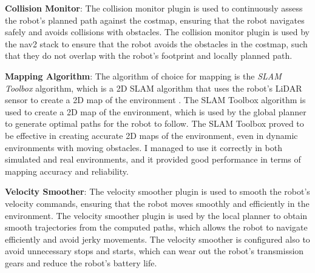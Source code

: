 \textbf{Collision Monitor}:
The collision monitor plugin is used to continuously assess the robot's planned path against the costmap, ensuring
that the robot navigates safely and avoids collisions with obstacles. The collision monitor plugin is used by the
nav2 stack to ensure that the robot avoids the obstacles in the costmap, such that they do not overlap with the robot's
footprint and locally planned path.

\textbf{Mapping Algorithm}:
The algorithm of choice for mapping is the \textit{SLAM Toolbox} algorithm, which is a 2D SLAM algorithm
that uses the robot's LiDAR sensor to create a 2D map of the environment \cite{Macenski2021slamtoolbox}.
The SLAM Toolbox algorithm is used to create
a 2D map of the environment, which is used by the global planner to generate optimal paths for the robot to follow.
The SLAM Toolbox proved to be effective in creating accurate 2D maps of the environment, even in dynamic environments
with moving obstacles. I managed to use it correctly in both simulated and real environments, and it provided
good performance in terms of mapping accuracy and reliability.

\textbf{Velocity Smoother}:
The velocity smoother plugin is used to smooth the robot's velocity commands, ensuring that the robot moves smoothly
and efficiently in the environment. The velocity smoother plugin is used by the local planner to obtain smooth
trajectories from the computed paths, which allows the robot to navigate efficiently and avoid jerky movements.
The velocity smoother is configured also to avoid unnecessary stops and starts, which can wear out the robot's transmission
gears and reduce the robot's battery life.

